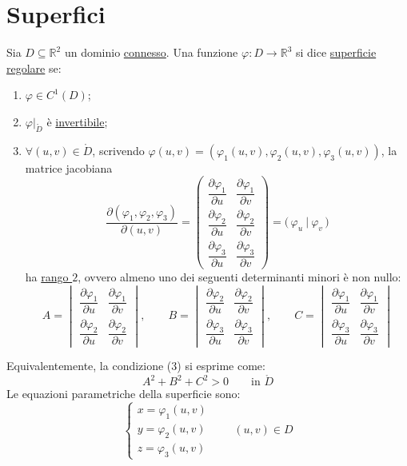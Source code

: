 \section{Superfici}

\begin{definition}
Sia $D \subseteq \mathbb{R}^2$ un dominio \underline{connesso}. Una funzione $\varphi : D \to \mathbb{R}^3$ si dice \underline{superficie regolare} se:
\begin{enumerate}
    \item $\varphi \in C^1(D)$;
    \item $\varphi|_{\mathring{D}}$ è \underline{invertibile};
    \item $\forall (u, v) \in \mathring{D}$, scrivendo $\varphi(u, v) = (\varphi_1(u, v), \varphi_2(u, v), \varphi_3(u, v))$, la matrice jacobiana
    \[
    \frac{\partial(\varphi_1, \varphi_2, \varphi_3)}{\partial(u, v)}
    = \begin{pmatrix}
    \dfrac{\partial \varphi_1}{\partial u} & \dfrac{\partial \varphi_1}{\partial v} \\[10pt]
    \dfrac{\partial \varphi_2}{\partial u} & \dfrac{\partial \varphi_2}{\partial v} \\[10pt]
    \dfrac{\partial \varphi_3}{\partial u} & \dfrac{\partial \varphi_3}{\partial v}
    \end{pmatrix}
    = \big(\, \varphi_u \ \big|\ \varphi_v \,\big)
    \]
    ha \underline{rango $2$}, ovvero almeno uno dei seguenti determinanti minori è non nullo:
    \[
    A = \begin{vmatrix}
    \dfrac{\partial \varphi_1}{\partial u} & \dfrac{\partial \varphi_1}{\partial v} \\[8pt]
    \dfrac{\partial \varphi_2}{\partial u} & \dfrac{\partial \varphi_2}{\partial v}
    \end{vmatrix}, \qquad
    B = \begin{vmatrix}
    \dfrac{\partial \varphi_2}{\partial u} & \dfrac{\partial \varphi_2}{\partial v} \\[8pt]
    \dfrac{\partial \varphi_3}{\partial u} & \dfrac{\partial \varphi_3}{\partial v}
    \end{vmatrix}, \qquad
    C = \begin{vmatrix}
    \dfrac{\partial \varphi_1}{\partial u} & \dfrac{\partial \varphi_1}{\partial v} \\[8pt]
    \dfrac{\partial \varphi_3}{\partial u} & \dfrac{\partial \varphi_3}{\partial v}
    \end{vmatrix}
    \]
\end{enumerate}
Equivalentemente, la condizione (3) si esprime come:
\[
A^2 + B^2 + C^2 > 0 \qquad \text{in } \mathring{D}
\]
Le equazioni parametriche della superficie sono:
\[
\begin{cases}
x = \varphi_1(u, v) \\
y = \varphi_2(u, v) \\
z = \varphi_3(u, v)
\end{cases}
\qquad (u, v) \in D
\]
\end{definition}

